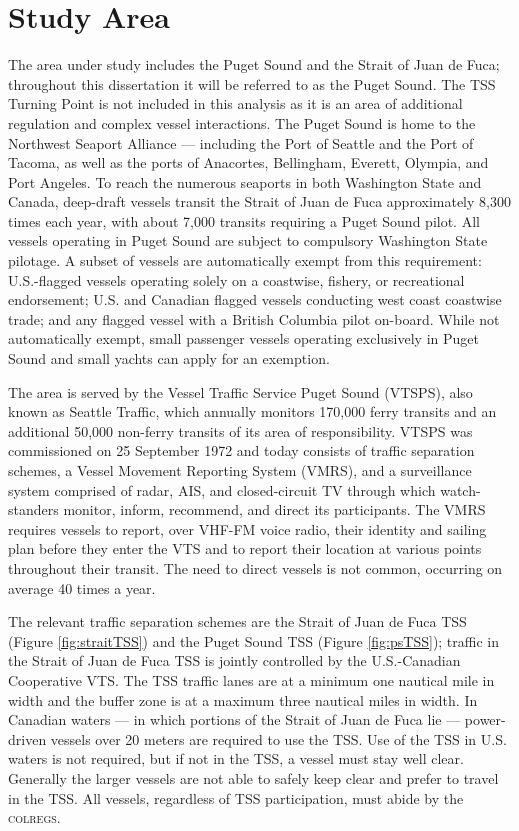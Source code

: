 \documentclass[twoside,symmetric,notoc]{tufte-book}
\begin{document}
\section{Study Area}
\par{%
The area under study includes the Puget Sound and the Strait of Juan de Fuca; throughout this dissertation it will be referred to as the Puget Sound. The TSS Turning Point is not included in this analysis as it is an area of additional regulation and complex vessel interactions. The Puget Sound is home to the Northwest Seaport Alliance --- including the Port of Seattle and the Port of Tacoma, as well as the ports of Anacortes, Bellingham, Everett, Olympia, and Port Angeles. To reach the numerous seaports in both Washington State and Canada, deep-draft vessels transit the Strait of Juan de Fuca approximately 8,300 times each year, with about 7,000 transits requiring a Puget Sound pilot.\cite{Ecology} All vessels operating in Puget Sound are subject to compulsory Washington State pilotage. A subset of vessels are automatically exempt from this requirement: U.S.-flagged vessels operating solely on a coastwise, fishery, or recreational endorsement; U.S. and Canadian flagged vessels conducting west coast coastwise trade; and any flagged vessel with a British Columbia pilot on-board. While not automatically exempt, small passenger vessels operating exclusively in Puget Sound and small yachts can apply for an exemption.\cite{Pilotage}
}
\par{%
The area is served by the Vessel Traffic Service Puget Sound (VTSPS), also known as Seattle Traffic, which annually monitors 170,000 ferry transits and an additional 50,000 non-ferry transits of its area of responsibility.\cite{PSP} VTSPS was commissioned on 25 September 1972\cite{vts} and today consists of traffic separation schemes, a Vessel Movement Reporting System (VMRS), and a surveillance system comprised of radar, AIS, and closed-circuit TV through which watch-standers monitor, inform, recommend, and direct its participants. The VMRS requires vessels to report, over VHF-FM voice radio, their identity and sailing plan before they enter the VTS and to report their location at various points throughout their transit. The need to direct vessels is not common, occurring on average 40 times a year.
}
\par{%
The relevant traffic separation schemes are the Strait of Juan de Fuca TSS (Figure \ref{fig:straitTSS}) and the Puget Sound TSS (Figure \ref{fig:psTSS}); traffic in the Strait of Juan de Fuca TSS is jointly controlled by the U.S.-Canadian Cooperative VTS. The TSS traffic lanes are at a minimum one nautical mile in width and the buffer zone is at a maximum three nautical miles in width. In Canadian waters --- in which portions of the Strait of Juan de Fuca lie --- power-driven vessels over 20 meters are required to use the TSS. Use of the TSS in U.S. waters is not required, but if not in the TSS, a vessel must stay well clear. Generally the larger vessels are not able to safely keep clear and prefer to travel in the TSS. All vessels, regardless of TSS participation, must abide by the \textsc{colregs}.
}
\end{document}
